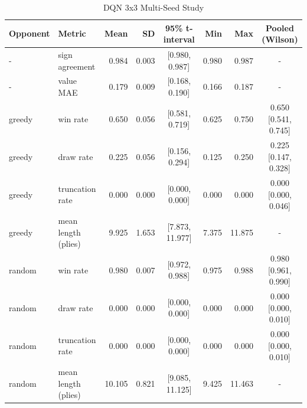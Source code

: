 \begin{table}[htbp]
\centering
\caption{DQN 3x3 Multi-Seed Study}
\label{tab:multi_seed}
\begin{tabular}{llrrcrrc}
\toprule
Opponent & Metric & Mean & SD & 95\% t-interval & Min & Max & Pooled (Wilson) \\
\midrule
- & sign agreement & 0.984 & 0.003 & [0.980, 0.987] & 0.980 & 0.987 & - \\
- & value MAE & 0.179 & 0.009 & [0.168, 0.190] & 0.166 & 0.187 & - \\
greedy & win rate & 0.650 & 0.056 & [0.581, 0.719] & 0.625 & 0.750 & 0.650 [0.541, 0.745] \\
greedy & draw rate & 0.225 & 0.056 & [0.156, 0.294] & 0.125 & 0.250 & 0.225 [0.147, 0.328] \\
greedy & truncation rate & 0.000 & 0.000 & [0.000, 0.000] & 0.000 & 0.000 & 0.000 [0.000, 0.046] \\
greedy & mean length (plies) & 9.925 & 1.653 & [7.873, 11.977] & 7.375 & 11.875 & - \\
random & win rate & 0.980 & 0.007 & [0.972, 0.988] & 0.975 & 0.988 & 0.980 [0.961, 0.990] \\
random & draw rate & 0.000 & 0.000 & [0.000, 0.000] & 0.000 & 0.000 & 0.000 [0.000, 0.010] \\
random & truncation rate & 0.000 & 0.000 & [0.000, 0.000] & 0.000 & 0.000 & 0.000 [0.000, 0.010] \\
random & mean length (plies) & 10.105 & 0.821 & [9.085, 11.125] & 9.425 & 11.463 & - \\
\bottomrule
\end{tabular}
\end{table}
